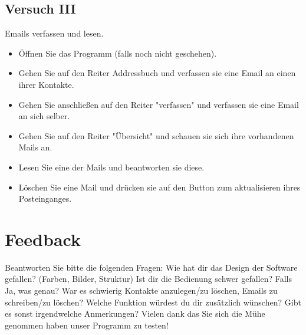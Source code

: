 \documentclass[10pt,a4paper]{article}
\begin{document}
\subsection*{Versuch III}
Emails verfassen und lesen.
\begin{itemize}
	\item Öffnen Sie das Programm (falls noch nicht geschehen).
	\item Gehen Sie auf den Reiter Addressbuch und verfassen sie eine Email an einen ihrer Kontakte.
	\item Gehen Sie anschließen auf den Reiter "verfassen" und verfassen sie eine Email an sich selber.
	\item Gehen Sie auf den Reiter "Übersicht" und schauen sie sich ihre vorhandenen Mails an.
	\item Lesen Sie eine der Mails und beantworten sie diese.
	\item Löschen Sie eine Mail und drücken sie auf den Button zum aktualisieren ihres Posteinganges. 	
\end{itemize}
\section*{Feedback}
Beantworten Sie bitte die folgenden Fragen:
Wie hat dir das Design der Software gefallen? (Farben, Bilder, Struktur)
Ist dir die Bedienung schwer gefallen? Falls Ja, was genau?
War es schwierig Kontakte anzulegen/zu löschen, Emails zu schreiben/zu löschen?
Welche Funktion würdest du dir zusätzlich wünschen?
Gibt es sonst irgendwelche Anmerkungen?
Vielen dank das Sie sich die Mühe genommen haben unser Programm zu testen!
\end{document}
